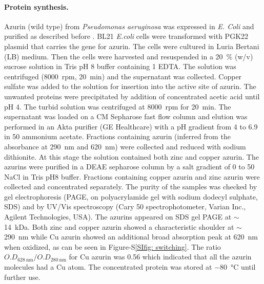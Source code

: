 \paragraph*{Protein synthesis.}
Azurin (wild type) from \textit{Pseudomonas aeruginosa} was expressed in \textit{E. Coli} and purified as described before \citep{kamp1990purification}.
BL21 \textit{E.coli} cells were transformed with PGK22 plasmid that carries the gene for azurin.
The cells were cultured in Luria Bertani (LB) medium.
Then the cells were harvested and resuspended in a \SI{20}{\percent} (w/v) sucrose solution in Tris pH 8 buffer containing \SI{1}{\mM} EDTA.
The solution was centrifuged (\SI{8000}{ rpm}, \SI{20}{\minute}) and the supernatant was collected.
Copper sulfate was added to the solution for insertion into the active site of azurin.
The unwanted proteins were precipitated by addition of concentrated acetic acid until pH 4. 
The turbid solution was centrifuged at \SI{8000}{ rpm} for \SI{20}{\minute}.
The supernatant was loaded on a CM Sepharose fast flow column and elution was performed in an Akta purifier (GE Healthcare) with a pH gradient from 4 to 6.9 in 
\SI{50}{\mM} ammonium acetate.
Fractions containing azurin (inferred from the absorbance at \SI{290}{\nm} and \SI{620}{\nm}) were collected and reduced with sodium dithionite.
At this stage the solution contained both zinc and copper azurin.
The azurins were purified in a DEAE sepharose column by a salt gradient of 0 to \SI{50}{\mM} NaCl in Tris pH8 buffer. 
Fractions containing copper azurin and zinc azurin were collected and concentrated separately.
The purity of the samples was checked by gel electrophoresis (PAGE, on polyacrylamide gel with sodium dodecyl sulphate, SDS) and by UV/Vis spectroscopy (Cary 50 spectrophotometer, Varian Inc., Agilent Technologies, USA).
The azurins appeared on SDS gel PAGE at $\sim$\SI{14}{ kDa}.
Both zinc and copper azurin showed a characteristic shoulder at ${\sim}$\SI{290}{\nm} while Cu azurin showed an additional 
broad absorption peak at \SI{620}{\nm} when oxidized, as can be seen in Figure-S\ref{SIfig: switching}. 
The ratio $O.D_{\SI{628}{\nm}}/O.D_{\SI{280}{\nm}}$ for Cu azurin was 0.56 which indicated that all the azurin molecules had a Cu atom. 
The concentrated protein was stored at \SI{-80}{\celsius} until further use.

